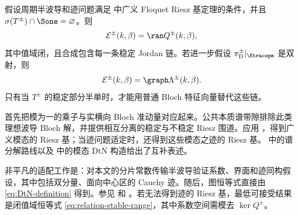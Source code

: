 \begin{proposition}
\label{prop:relation-Bloch}
假设周期半波导和迹问题满足 \cite[Theorem~2.2]{HohageSoussi2013} 中广义 Floquet Riesz 基定理的条件，并且 $\sigma(T^\pm)\cap\Sone=\varnothing$。则
\begin{equation}
  \mathcal E^\pm(k,\beta)=\ran Q^\pm(k,\beta),
  \label{eq:relation-stable-range}
\end{equation}
其中值域闭，且合成包含每一条稳定 Jordan 链。若进一步假设 $\pi_{\mathrm D}^\pm|_{\Etracepm}$ 是双射，则
\begin{equation}
  \mathcal E^\pm(k,\beta)
  =\graph\Lambda^\pm(k,\beta).
  \label{eq:relation-DtN-graph}
\end{equation}
只有当 $T^\pm$ 的稳定部分半单时，才能用普通 Bloch 特征向量替代这些链。
\end{proposition}
\begin{proofroadmap}
首先把模为一的乘子与实横向 Bloch 准动量对应起来。公共本质谱带隙排除此类理想波导 Bloch 解，并提供相互分离的稳定与不稳定 Riesz 围道。应用 \cite[Theorem~2.2 and Propositions~6.1--6.2]{HohageSoussi2013}，得到广义模态的 Riesz 基；当迹问题适定时，还得到这些模态之迹的 Riesz 基。\cite[Sections~3--5]{Zhang2021} 中的谱分解路线以及 \cite{Zhang2023} 中的模态 DtN 构造给出了互补表述。

非平凡的适配工作是：对本文的分片常数传输半波导验证系数、界面和迹同构假设，其中包括双分量、面向中心区的 Cauchy 迹。随后，图恒等式直接由 \eqref{eq:DtN-definition} 得到。参见  和 。若无法得到迹的 Riesz 基，最低可接受结果是闭值域恒等式 \eqref{eq:relation-stable-range}，其中系数空间需模去 $\ker Q^\pm$。
\end{proofroadmap}
